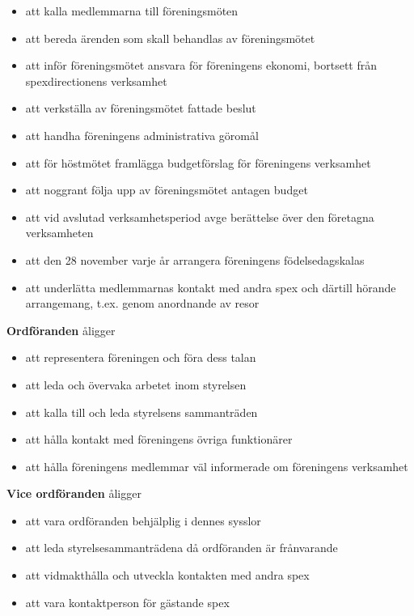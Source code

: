 \documentclass[a4paper]{article}
\begin{document}
\begin{itemize}
  \item att kalla medlemmarna till föreningsmöten
  \item att bereda ärenden som skall behandlas av föreningsmötet
  \item att inför föreningsmötet ansvara för föreningens ekonomi, bortsett från spexdirectionens verksamhet
  \item att verkställa av föreningsmötet fattade beslut
  \item att handha föreningens administrativa göromål
  \item att för höstmötet framlägga budgetförslag för föreningens verksamhet
  \item att noggrant följa upp av föreningsmötet antagen budget
  \item att vid avslutad verksamhetsperiod avge berättelse över den företagna verksamheten
  \item att den 28 november varje år arrangera föreningens födelsedagskalas
  \item att underlätta medlemmarnas kontakt med andra spex och därtill hörande arrangemang, t.ex. genom anordnande av resor
\end{itemize}

\noindent
\textbf{Ordföranden} åligger

\begin{itemize}
  \item att representera föreningen och föra dess talan
  \item att leda och övervaka arbetet inom styrelsen
  \item att kalla till och leda styrelsens sammanträden
  \item att hålla kontakt med föreningens övriga funktionärer
  \item att hålla föreningens medlemmar väl informerade om föreningens verksamhet
\end{itemize}

\noindent
\textbf{Vice ordföranden} åligger

\begin{itemize}
  \item att vara ordföranden behjälplig i dennes sysslor
  \item att leda styrelsesammanträdena då ordföranden är frånvarande
  \item att vidmakthålla och utveckla kontakten med andra spex
  \item att vara kontaktperson för gästande spex
\end{itemize}
\end{document}
